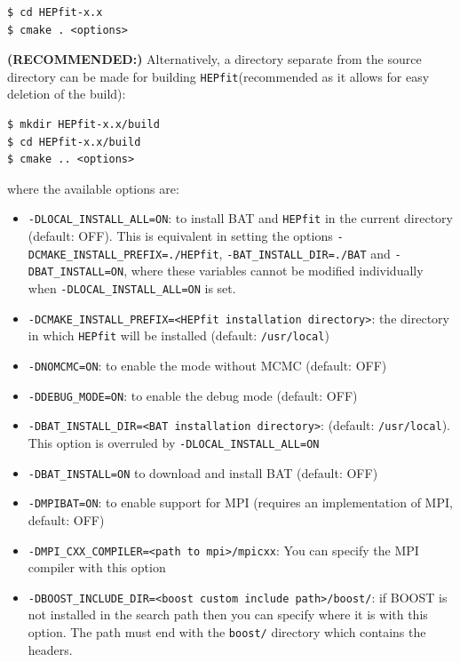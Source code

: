 \documentclass[preprint,3p,12pt]{elsarticle}
\newcommand{\HEPfit}{\texttt{HEPfit}\xspace}
\begin{document}
{\begin{lstlisting}
$ cd HEPfit-x.x  
$ cmake . <options>  
\end{lstlisting}

{\bf (RECOMMENDED:)} Alternatively, a directory separate from the source directory can be made for
building \HEPfit (recommended as it allows for easy deletion of the build):
\begin{lstlisting}
$ mkdir HEPfit-x.x/build  
$ cd HEPfit-x.x/build  
$ cmake .. <options>  
\end{lstlisting}

where the available options are:

\begin{itemize}
\item \texttt{-DLOCAL\_INSTALL\_ALL=ON}: to install BAT and \HEPfit in the current directory (default: OFF). 
    This is equivalent in setting the options \texttt{-DCMAKE\_INSTALL\_PREFIX=./HEPfit}, 
    \texttt{-BAT\_INSTALL\_DIR=./BAT} and \texttt{-DBAT\_INSTALL=ON}, where these variables cannot 
    be modified individually when \texttt{-DLOCAL\_INSTALL\_ALL=ON} is set. 

\item \texttt{-DCMAKE\_INSTALL\_PREFIX=<HEPfit installation directory>}: the directory in which \HEPfit will be installed (default: \texttt{/usr/local})  
  
\item \texttt{-DNOMCMC=ON}: to enable the mode without MCMC (default: OFF)

\item \texttt{-DDEBUG\_MODE=ON}: to enable the debug mode (default: OFF)

\item \texttt{-DBAT\_INSTALL\_DIR=<BAT installation directory>}: (default: \texttt{/usr/local}). This option is overruled by \texttt{-DLOCAL\_INSTALL\_ALL=ON}

\item \texttt{-DBAT\_INSTALL=ON} to download and install BAT (default: OFF)

\item \texttt{-DMPIBAT=ON}: to enable support for MPI
    (requires an implementation of MPI, default: OFF)

\item \texttt{-DMPI\_CXX\_COMPILER=<path to mpi>/mpicxx}: You can specify the MPI compiler with this option

\item \texttt{-DBOOST\_INCLUDE\_DIR=<boost custom include path>/boost/}: if BOOST is not installed in the search path then you can specify where it is with this option. The path must end with the \texttt{boost/} directory which contains the headers.


\end{itemize}}
\end{document}
